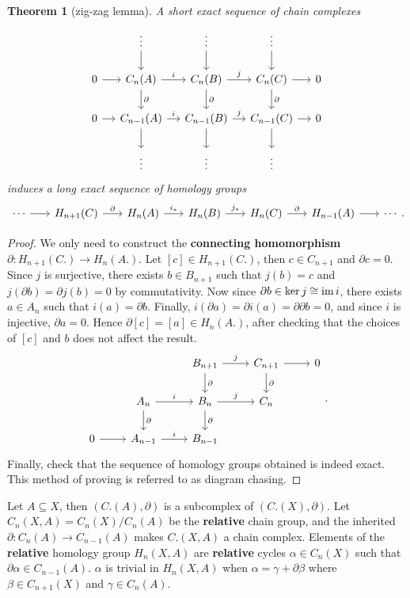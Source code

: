 \documentclass[11pt]{article}
\theoremstyle{definition}
\theoremstyle{plain}
\newtheorem{theorem}{Theorem}[section]
\theoremstyle{remark}
\newcommand{\im}{\textup{im}\,}
\begin{document}
\begin{theorem}[zig-zag lemma]\label{zig-zag lemma}
A short exact sequence of chain complexes
\[\begin{tikzcd}[column sep=small]
&\vdots\arrow{d}&\vdots\arrow{d}&\vdots\arrow{d}\\
0\arrow{r}&C_n(A)\arrow{d}{\partial}\arrow{r}{i}&C_n(B)\arrow{d}{\partial}\arrow{r}{j}&C_n(C)\arrow{d}{\partial}\arrow{r}&0\\
0\arrow{r}&C_{n-1}(A)\arrow{d}\arrow{r}{i}&C_{n-1}(B)\arrow{d}\arrow{r}{j}&C_{n-1}(C)\arrow{d}\arrow{r}&0\\
&\vdots&\vdots&\vdots
\end{tikzcd}\]
induces a long exact sequence of homology groups
\[\begin{tikzcd}[column sep=scriptsize]
\cdots\arrow{r}&H_{n+1}(C)\arrow{r}{\partial}&H_n(A)\arrow{r}{i_\ast}&H_n(B)\arrow{r}{j_\ast}&H_n(C)\arrow{r}{\partial}&H_{n-1}(A)\arrow{r}&\cdots
\end{tikzcd}.\]
\end{theorem}
\begin{proof}
We only need to construct the \textbf{connecting homomorphism} $\partial:H_{n+1}(C.)\to H_n(A.)$. Let $[c]\in H_{n+1}(C.)$, then $c\in C_{n+1}$ and $\partial c=0$. Since $j$ is surjective, there exists $b\in B_{n+1}$ such that $j(b)=c$ and $j(\partial b)=\partial j(b)=0$ by commutativity. Now since $\partial b\in\ker j\cong\im i$, there exists $a\in A_n$ such that $i(a)=\partial b$. Finally, $i(\partial a)=\partial i(a)=\partial\partial b=0$, and since $i$ is injective, $\partial a=0$. Hence $\partial[c]=[a]\in H_n(A.)$, after checking that the choices of $[c]$ and $b$ does not affect the result.
\[\begin{tikzcd}
&&B_{n+1}\arrow{d}{\partial}\arrow{r}{j}&C_{n+1}\arrow{d}{\partial}\arrow{r}&0\\
&A_n\arrow{d}{\partial}\arrow{r}{i}&B_n\arrow{d}{\partial}\arrow{r}{j}&C_n\\
0\arrow{r}&A_{n-1}\arrow{r}{i}&B_{n-1}
\end{tikzcd}.\]
Finally, check that the sequence of homology groups obtained is indeed exact. This method of proving is referred to as diagram chasing.
\end{proof}

Let $A\subseteq X$, then $(C.(A),\partial)$ is a subcomplex of $(C.(X),\partial)$. Let $C_n(X,A)=C_n(X)/C_n(A)$ be the \textbf{relative} chain group, and the inherited $\partial:C_n(A)\to C_{n-1}(A)$ makes $C.(X,A)$ a chain complex. Elements of the \textbf{relative} homology group $H_n(X,A)$ are \textbf{relative} cycles $\alpha\in C_n(X)$ such that $\partial\alpha\in C_{n-1}(A)$. $\alpha$ is trivial in $H_n(X,A)$ when $\alpha=\gamma+\partial\beta$ where $\beta\in C_{n+1}(X)$ and $\gamma\in C_n(A)$.\medbreak
\end{document}
